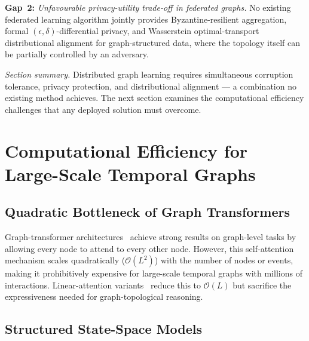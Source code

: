 \medskip
\noindent\textbf{Gap~2:} \emph{Unfavourable privacy-utility trade-off in federated graphs.} No existing federated learning algorithm jointly provides Byzantine-resilient aggregation, formal $(\epsilon,\delta)$-differential privacy, and Wasserstein optimal-transport distributional alignment for graph-structured data, where the topology itself can be partially controlled by an adversary.

\medskip
\noindent\textit{Section summary.} Distributed graph learning requires simultaneous corruption tolerance, privacy protection, and distributional alignment --- a combination no existing method achieves. The next section examines the computational efficiency challenges that any deployed solution must overcome.


\section{Computational Efficiency for Large-Scale Temporal Graphs}
\label{sec:efficiency}

\subsection{Quadratic Bottleneck of Graph Transformers}

Graph-transformer architectures~\cite{Vaswani2017,Ying2021} achieve strong results on graph-level tasks by allowing every node to attend to every other node. However, this self-attention mechanism scales quadratically ($\mathcal{O}(L^2)$) with the number of nodes or events, making it prohibitively expensive for large-scale temporal graphs with millions of interactions. Linear-attention variants~\cite{Katharopoulos2020} reduce this to $\mathcal{O}(L)$ but sacrifice the expressiveness needed for graph-topological reasoning.


\subsection{Structured State-Space Models}

